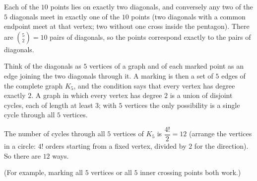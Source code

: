 Each of the $10$ points lies on exactly two diagonals, and conversely any two of the $5$ diagonals meet in exactly one of the $10$ points (two diagonals with a common endpoint meet at that vertex; two without one cross inside the pentagon). There are $\binom52=10$ pairs of diagonals, so the points correspond exactly to the pairs of diagonals.

Think of the diagonals as $5$ vertices of a graph and of each marked point as an edge joining the two diagonals through it. A marking is then a set of $5$ edges of the complete graph $K_5$, and the condition says that every vertex has degree exactly $2$. A graph in which every vertex has degree $2$ is a union of disjoint cycles, each of length at least $3$; with $5$ vertices the only possibility is a single cycle through all $5$ vertices.

The number of cycles through all $5$ vertices of $K_5$ is $\dfrac{4!}{2}=12$ (arrange the vertices in a circle: $4!$ orders starting from a fixed vertex, divided by $2$ for the direction). So there are $\boxed{12}$ ways.

(For example, marking all $5$ vertices or all $5$ inner crossing points both work.)
